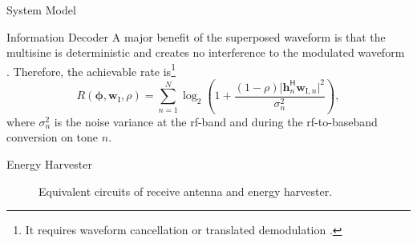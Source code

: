 \begin{section}{System Model}
	\begin{subsection}{Information Decoder}
		A major benefit of the superposed waveform is that the multisine is deterministic and creates no interference to the modulated waveform \cite{Clerckx2018b}. Therefore, the achievable rate is\footnote{It requires waveform cancellation or translated demodulation \cite{Clerckx2018b}.}
		\begin{equation}\label{eq:R}
			R(\mathbf{\phi},\mathbf{w}_{\mathrm{I}},\rho) = \sum_{n=1}^N{\log_2\left(1+\frac{(1-\rho)\lvert \mathbf{h}_{n}^\mathsf{H}\mathbf{w}_{\mathrm{I},n} \rvert^2}{\sigma_n^2}\right)},
		\end{equation}
		where $\sigma_n^2$ is the noise variance at the \gls{rf}-band and during the \gls{rf}-to-baseband conversion on tone $n$.
	\end{subsection}


	\begin{subsection}{Energy Harvester}\label{se:energy_harvester}
		\begin{figure}[!t]
			\centering
			\caption{Equivalent circuits of receive antenna and energy harvester.}
		\end{figure}


\end{subsection}
\end{section}
